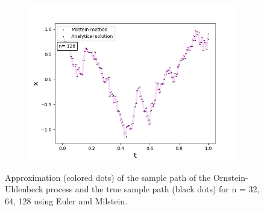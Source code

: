 \begin{figure}[!h]
\begin{subfigure}{0.49\linewidth}
   \end{subfigure}
   \begin{subfigure}{0.49\linewidth} \centering
     \includegraphics[scale=0.4]{Content/Graphics/Appendix/6ou}
   \end{subfigure}
\caption{Approximation (colored dots) of the sample path of the Ornstein-Uhlenbeck process and the true sample path (black dots) for n = 32, 64, 128 using Euler and Milstein.}
\end{figure}


